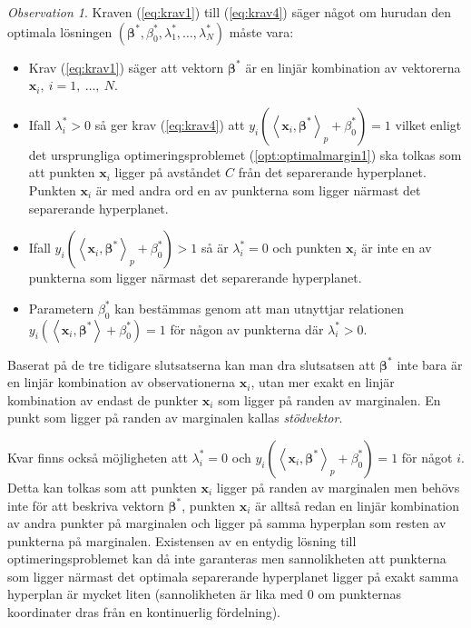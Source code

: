 \documentclass[a4paper, 12pt]{report}
\theoremstyle{definition}
\theoremstyle{remark}
\newtheorem*{rem}{Observation}
\newcommand{\bfbeta}{{\boldsymbol{\beta}}}
\newcommand{\bfx}{\mathbf{x}}
\newcommand{\llangle}{\left\langle}
\newcommand{\rrangle}{\right\rangle}
\newcommand{\inner}[2]{\llangle #1, #2 \rrangle}
\begin{document}
\begin{rem}
	Kraven (\ref{eq:krav1}) till (\ref{eq:krav4}) säger något om hurudan den optimala lösningen $\left(\bfbeta^*, \beta^*_0, \lambda_1^*, \dots, \lambda_N^*\right)$ måste vara:
	\begin{itemize}
		\item Krav (\ref{eq:krav1}) säger att vektorn $\bfbeta^*$ är en linjär kombination av vektorerna $\mathbf{x}_i,~i=1,~\dots,~N$.
		\item Ifall $\lambda^*_i > 0$ så ger krav (\ref{eq:krav4}) att $y_i\left(\inner{\bfx_i}{\bfbeta^*}_p+\beta^*_0\right) = 1$ vilket enligt det ursprungliga optimeringsproblemet (\ref{opt:optimalmargin1}) ska tolkas som att punkten $\mathbf{x}_i$ ligger på avståndet $C$ från det separerande hyperplanet. Punkten $\mathbf{x}_i$ är med andra ord en av punkterna som ligger närmast det separerande hyperplanet.
		\item Ifall $y_i\left(\inner{\bfx_i}{\bfbeta^*}_p + \beta^*_0\right) > 1$ så är $\lambda^*_i = 0$ och punkten $\mathbf{x}_i$ är inte en av punkterna som ligger närmast det separerande hyperplanet.
		\item Parametern $\beta^*_0$ kan bestämmas genom att man utnyttjar relationen $y_i\left( \inner{\bfx_i}{\bfbeta^*} + \beta^*_0\right) = 1$ för någon av punkterna där $\lambda^*_i > 0$.
	\end{itemize}
	Baserat på de tre tidigare slutsatserna kan man dra slutsatsen att $\bfbeta^*$ inte bara är en linjär kombination av observationerna $\mathbf{x}_i$, utan mer exakt en linjär kombination av endast de punkter $\mathbf{x}_{i}$ som ligger på randen av marginalen. En punkt som ligger på randen av marginalen kallas \emph{stödvektor}.
\end{rem}

Kvar finns också möjligheten att $\lambda^*_i = 0$ och $y_i\left( \inner{\bfx_i}{\bfbeta^*}_p + \beta^*_0\right) = 1$ för något $i$.
Detta kan tolkas som att punkten $\bfx_i$ ligger på randen av marginalen men behövs inte för att beskriva vektorn $\bfbeta^*$, punkten $\bfx_i$ är alltså redan en linjär kombination av andra punkter på marginalen och ligger på samma hyperplan som resten av punkterna på marginalen.
Existensen av en entydig lösning till optimeringsproblemet kan då inte garanteras men sannolikheten att punkterna som ligger närmast det optimala separerande hyperplanet ligger på exakt samma hyperplan är mycket liten (sannolikheten är lika med 0 om punkternas koordinater dras från en kontinuerlig fördelning).
\newpage
\end{document}
